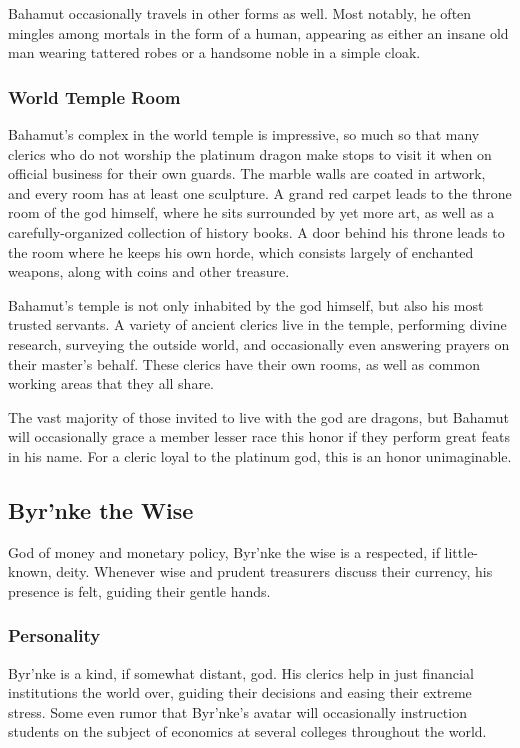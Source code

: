 Bahamut occasionally travels in other forms as well.
Most notably, he often mingles among mortals in the form of a human, appearing as either an insane old man wearing tattered robes or a handsome noble in a simple cloak.


\subsubsection*{World Temple Room}
Bahamut's complex in the world temple is impressive, so much so that many clerics who do not worship the platinum dragon make stops to visit it when on official business for their own guards.
The marble walls are coated in artwork, and every room has at least one sculpture.
A grand red carpet leads to the throne room of the god himself, where he sits surrounded by yet more art, as well as a carefully-organized collection of history books.
A door behind his throne leads to the room where he keeps his own horde, which consists largely of enchanted weapons, along with coins and other treasure.

Bahamut's temple is not only inhabited by the god himself, but also his most trusted servants.
A variety of ancient clerics live in the temple, performing divine research, surveying the outside world, and occasionally even answering prayers on their master's behalf.
These clerics have their own rooms, as well as common working areas that they all share.

The vast majority of those invited to live with the god are dragons, but Bahamut will occasionally grace a member lesser race this honor if they perform great feats in his name.
For a cleric loyal to the platinum god, this is an honor unimaginable.

\subsection*{Byr'nke the Wise}
\begin{goddesc}
\end{goddesc}
God of money and monetary policy, Byr'nke the wise is a respected, if little-known, deity.
Whenever wise and prudent treasurers discuss their currency, his presence is felt, guiding their gentle hands.

\subsubsection*{Personality}
Byr'nke is a kind, if somewhat distant, god.
His clerics help in just financial institutions the world over, guiding their decisions and easing their extreme stress.
Some even rumor that Byr'nke's avatar will occasionally instruction students on the subject of economics at several colleges throughout the world.

